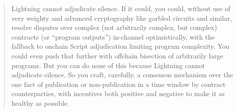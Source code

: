 \documentclass[11pt]{article}
\begin{document}
\begin{quote}
Lightning cannot adjudicate silence. If it could, you could, without use of very weighty and advanced cryptography like garbled circuits and similar, resolve disputes over complex (not arbitrarily complex, but complex) contracts (or ``program outputs'') in-channel optimistically, with the fallback to onchain Script adjudication limiting program complexity. You could even push that further with offchain bisection of arbitrarily large programs. But you can do none of this because Lightning cannot adjudicate silence. So you craft, carefully, a consensus mechanism over the one fact of publication or non-publication in a time window by contract counterparties, with incentives both positive and negative to make it as healthy as possible.
\end{quote}
\end{document}

